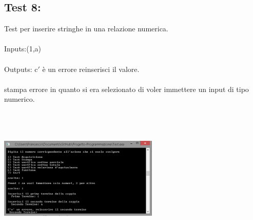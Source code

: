 \documentclass[11pt, a4paper, titlepage, block]{article}
\begin{document}
	\subsection{Test 8:}
	Test per inserire stringhe in una relazione numerica.\\
	\\
	Inputs:(1,a)\\
	\\
	Outputs: c$'$ \`e un errore reinserisci il valore.\\
	\\
	stampa errore in quanto si era selezionato di voler immettere un input di tipo numerico.\\
	\includegraphics[width=3in,height=3in,viewport=0 0 300 300]{../Screenshots/Test8Input.png}
	\\
	\\
	\newpage
\end{document}
